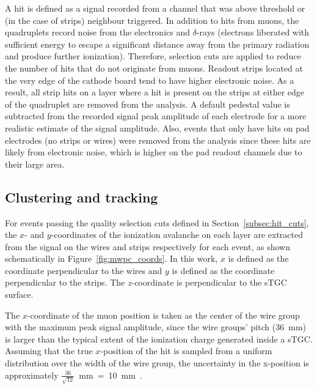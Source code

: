 A hit is defined as a signal recorded from a channel that was above threshold or (in the case of strips) neighbour triggered. In addition to hits from muons, the quadruplets record noise from the electronics and $\delta$-rays (electrons liberated with sufficient energy to escape a significant distance away from the primary radiation and produce further ionization). Therefore, selection cuts are applied to reduce the number of hits that do not originate from muons. Readout strips located at the very edge of the cathode board tend to have higher electronic noise.  As a result, all strip hits on a layer where a hit is present on the strips at either edge of the quadruplet are removed from the analysis. A default pedestal value is subtracted from the recorded signal peak amplitude of each electrode for a more realistic estimate of the signal amplitude. Also, events that only have hits on pad electrodes (no strips or wires) were removed from the analysis since these hits are likely from electronic noise, which is higher on the pad readout channels due to their large area.

\subsection{Clustering and tracking}
\label{subsec:clustering}
For events passing the quality selection cuts defined in Section~\ref{subsec:hit_cuts}, the $x$- and $y$-coordinates of the ionization avalanche on each layer are extracted from the signal on the wires and strips respectively for each event, as shown schematically in Figure~\ref{fig:mwpc_coords}. In this work, $x$ is defined as the coordinate perpendicular to the wires and $y$ is defined as the coordinate perpendicular to the strips. The $z$-coordinate is perpendicular to the sTGC surface.

The $x$-coordinate of the muon position is taken as the center of the wire group with the maximum peak signal amplitude, since the wire groups' pitch (\SI{36}{\milli\meter}) is larger than the typical extent of the ionization charge generated inside a sTGC. Assuming that the true $x$-position of the hit is sampled from a uniform distribution over the width of the wire group, the uncertainty in the x-position is approximately $\frac{36}{\sqrt{12}}$~mm~=~10~mm~\cite{Sauli:117989}.

